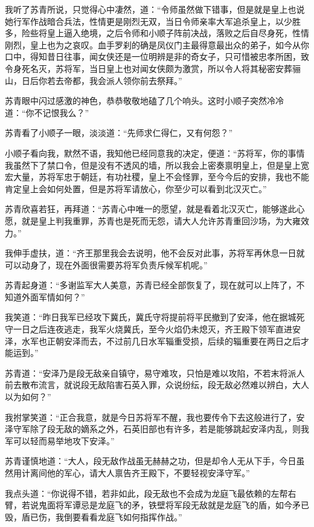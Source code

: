 我听了苏青所说，只觉得心中凄然，道：“令师虽然做下错事，但是就是皇上也说她行军作战暗合兵法，性情更是刚烈无双，当日令师亲率大军追杀皇上，以少胜多，险些将皇上逼入绝境，之后令师和小顺子阵前决战，落败之后自尽身死，性情刚烈，皇上也为之哀叹。血手罗刹的确是凤仪门主最得意最出众的弟子，如今从你口中，得知昔日往事，闻女侠还是一位明辨是非的奇女子，只可惜被忠孝所困，致令身死名灭，苏将军，当日皇上也对闻女侠颇为激赏，所以令人将其秘密安葬骊山，日后你若去帝都，我会派人领你前去祭拜。”

苏青眼中闪过感激的神色，恭恭敬敬地磕了几个响头。这时小顺子突然冷冷道：“你不记恨我么？”

苏青看了小顺子一眼，淡淡道：“先师求仁得仁，又有何怨？”

小顺子看向我，默然不语，我知他已经同意我的决定，便道：“苏将军，你的事情我虽然下了禁口令，但是没有不透风的墙，所以我会上密奏禀明皇上，但是皇上宽宏大量，苏将军忠于朝廷，有功社稷，皇上不会怪罪，至今今后的安排，我也不能肯定皇上会如何处置，但是苏将军请放心，你至少可以看到北汉灭亡。”

苏青欣喜若狂，再拜道：“苏青心中唯一的愿望，就是看着北汉灭亡，能够遂此心愿，就是皇上判我重罪，苏青也是死而无怨，请大人允许苏青重回沙场，为大雍效力。”

我伸手虚扶，道：“齐王那里我会去说明，他不会反对此事，苏将军再休息一日就可以动身了，现在外面很需要苏将军负责斥候军机呢。”

苏青起身道：“多谢监军大人美意，苏青已经全部恢复了，现在就可以上阵了，不知道外面军情如何？”

我笑道：“昨日我军已经攻下冀氏，冀氏守将提前将平民撤到了安泽，他在据城死守一日之后连夜逃走，我军火烧冀氏，至今火焰仍未熄灭，齐王殿下领军直进安泽，水军也正朝安泽而去，不过前几日水军辎重受损，后续的辎重要在两日之后才能运到。”

苏青道：“安泽乃是段无敌亲自镇守，易守难攻，只怕是难以攻陷，不若末将派人前去散布流言，就说段无敌陷害石英入罪，众说纷纭，段无敌必然难以辨白，大人以为如何？”

我拊掌笑道：“正合我意，就是今日苏将军不醒，我也要传令下去这般进行了，安泽守军除了段无敌的嫡系之外，石英旧部也有许多，若是能够跳起安泽内乱，则我军可以轻而易举地攻下安泽。”

苏青谨慎地道：“大人，段无敌作战虽无赫赫之功，但是却令人无从下手，今日虽然用计离间他的军心，请大人禀告齐王殿下，不要轻视安泽守军。”

我点头道：“你说得不错，若非如此，段无敌也不会成为龙庭飞最依赖的左帮右臂，若说鬼面将军谭忌是龙庭飞的矛，铁壁将军段无敌就是龙庭飞的盾，如今矛已毁，盾已伤，我倒要看看龙庭飞如何指挥作战。”

